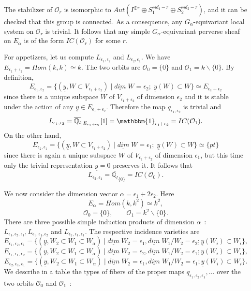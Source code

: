 \documentclass[a4paper,10pt]{amsart}
\def\a{\alpha}
\def\qlb{\overline{\mathbb{Q}_l}}
\numberwithin{equation}{section}
\begin{document}
The stabilizer of $\mathcal{O}_r$ is isomorphic to $Aut(I^{\oplus r} \oplus S_1^{\oplus d_1-r} \oplus S_2^{\oplus d_2-r})$, and it can be checked that this group is connected. As a consequence, any $G_{\a}$-equivariant local system on $\mathcal{O}_r$ is trivial. It follows that any simple $G_{\a}$-equivariant perverse sheaf on $E_{\a}$ is of the form $IC(\mathcal{O}_r)$ for some $r$. 

\vspace{.1in}

For appetizers, let us compute $L_{\epsilon_1, \epsilon_2}$ and $L_{\epsilon_2, \epsilon_1}$. We have $E_{\epsilon_1+\epsilon_2}=Hom(k,k) \simeq k$. The two orbits are $\mathcal{O}_0=\{0\}$ and $\mathcal{O}_1=k \backslash\{0\}$. By definition,
$$E_{\epsilon_1, \epsilon_2}=\big\{ (\underline{y}, W \subset V_{\epsilon_1+\epsilon_2})\;|\; \underline{dim}\;W=\epsilon_2; \;\underline{y}(W) \subset W\big\} \simeq E_{\epsilon_1+\epsilon_2}$$
since there is a unique subspace $W$ of $V_{\epsilon_1+\epsilon_2}$ of dimension $\epsilon_2$ and it is stable under the action of any $\underline{y} \in E_{\epsilon_1+\epsilon_2}$. Therefore the map $q_{\epsilon_1, \epsilon_2}$ is trivial and 
$$L_{\epsilon_1, \epsilon_2}=\qlb_{|E_{\epsilon_1+\epsilon_2}}[1]=\mathbbm{1}_{\epsilon_1+\epsilon_2}=IC(\mathcal{O}_1).$$
On the other hand,
$$E_{\epsilon_2, \epsilon_1}=\big\{ (\underline{y}, W \subset V_{\epsilon_1+\epsilon_2})\;|\; \underline{dim}\;W=\epsilon_1;\; \underline{y}(W) \subset W\big\} \simeq \{pt\}$$
since there is again a unique subspace $W$ of $V_{\epsilon_1+\epsilon_2}$ of dimension $\epsilon_1$, but this time only the trivial representation $\underline{y}=0$ preserves it. It follows that
$$L_{\epsilon_2, \epsilon_1}=\qlb_{\{0\}}=IC(\mathcal{O}_0).$$

\vspace{.1in}

We now consider the dimension vector $\a=\epsilon_1+2\epsilon_2$. Here
$$E_{\a}=Hom(k,k^2) \simeq k^2,$$
$$\mathcal{O}_0=\{0\}, \qquad \mathcal{O}_{1}=k^2 \backslash \{0\}.$$
There are three possible simple induction products of dimension $\a$~: $L_{\epsilon_1, \epsilon_2, \epsilon_1}, L_{\epsilon_1, \epsilon_1, \epsilon_2}$ and $L_{\epsilon_2, \epsilon_1, \epsilon_1}$. The respective incidence varieties are
$$E_{\epsilon_1, \epsilon_2, \epsilon_1}=\big\{ (\underline{y}, W_2 \subset W_1 \subset W_{\a})\;|\;\underline{dim}\;W_2=\epsilon_1, \underline{dim}\; W_1/W_2=\epsilon_2; \underline{y}(W_i) \subset W_i\big\},$$
$$E_{\epsilon_1, \epsilon_1, \epsilon_2}=\big\{ (\underline{y}, W_2 \subset W_1 \subset W_{\a})\;|\;\underline{dim}\;W_2=\epsilon_2, \underline{dim}\; W_1/W_2=\epsilon_1; \underline{y}(W_i) \subset W_i\big\},$$
$$E_{\epsilon_2, \epsilon_1, \epsilon_1}=\big\{ (\underline{y}, W_2 \subset W_1 \subset W_{\a})\;|\;\underline{dim}\;W_2=\epsilon_1, \underline{dim}\; W_1/W_2=\epsilon_1; \underline{y}(W_i) \subset W_i\big\}.$$
We describe in a table the types of fibers of the proper maps $q_{\epsilon_1, \epsilon_2, \epsilon_1},...$ over the two orbits $\mathcal{O}_0$ and $\mathcal{O}_1$~:
\end{document}
